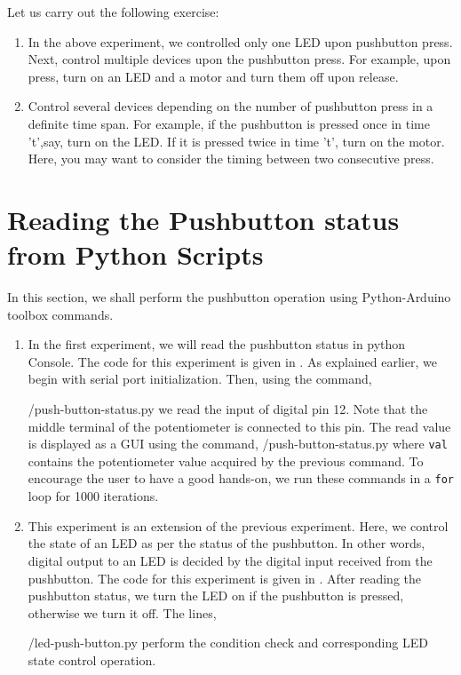 \begin{exercise}
Let us carry out the following exercise:
\begin{enumerate}
\item In the above experiment, we controlled only one LED upon
  pushbutton press. Next, control multiple devices upon the pushbutton
  press. For example, upon press, turn on an LED and a motor and turn
  them off upon release.
\item Control several devices depending on the number of pushbutton
  press in a definite time span. For example, if the pushbutton is
  pressed once in time 't',say, turn on the LED. If it is pressed
  twice in time 't', turn on the motor. Here, you may want to consider
  the timing between two consecutive press.
\end{enumerate}
\end{exercise}

\section{Reading the Pushbutton status from Python Scripts}
In this section, we shall perform the pushbutton operation using
Python-Arduino toolbox commands.
\begin{enumerate}
\item In the first experiment, we will read the pushbutton status in
  python Console. The code for this experiment is given in
  . As explained earlier, we begin with serial
  port initialization. Then, using the command,
  
  {\LocPushpycode/push-button-status.py} we read the input of
  digital pin 12. Note that the middle terminal of the potentiometer
  is connected to this pin. The read value is displayed as a GUI using
  the command, 
  {\LocPushpycode/push-button-status.py} where {\tt val} contains
  the potentiometer value acquired by the previous command. To
  encourage the user to have a good hands-on, we run these commands in
  a {\tt for} loop for 1000 iterations.

\item This experiment is an extension of the previous
  experiment. Here, we control the state of an LED as per the status
  of the pushbutton. In other words, digital output to an LED is
  decided by the digital input received from the pushbutton. The code
  for this experiment is given in . After reading
  the pushbutton status, we turn the LED on if the pushbutton is
  pressed, otherwise we turn it off. The lines,
  
  {\LocPushpycode/led-push-button.py} perform the condition check
  and corresponding LED state control operation.
\end{enumerate}

